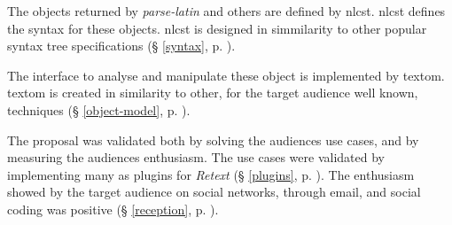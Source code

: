 The objects returned by \emph{parse-latin} and others are defined by
  \acrshort{nlcst}. \acrshort{nlcst} defines the syntax for these objects.
  \acrshort{nlcst} is designed in simmilarity to other popular syntax tree
  specifications (§ \ref{syntax}, p. \pageref{syntax}).

The interface to analyse and manipulate these object is implemented by
  \gls{textom}. \gls{textom} is created in similarity to other, for the target
  audience well known, techniques
  (§ \ref{object-model}, p. \pageref{object-model}).

The proposal was validated both by solving the audiences use cases, and
  by measuring the audiences enthusiasm.
The use cases were validated by implementing many as plugins for
  \emph{Retext} (§ \ref{plugins}, p. \pageref{plugins}).
The enthusiasm showed by the target audience on social networks, through
  email, and social coding was positive
  (§ \ref{reception}, p. \pageref{reception}).

\endgroup
